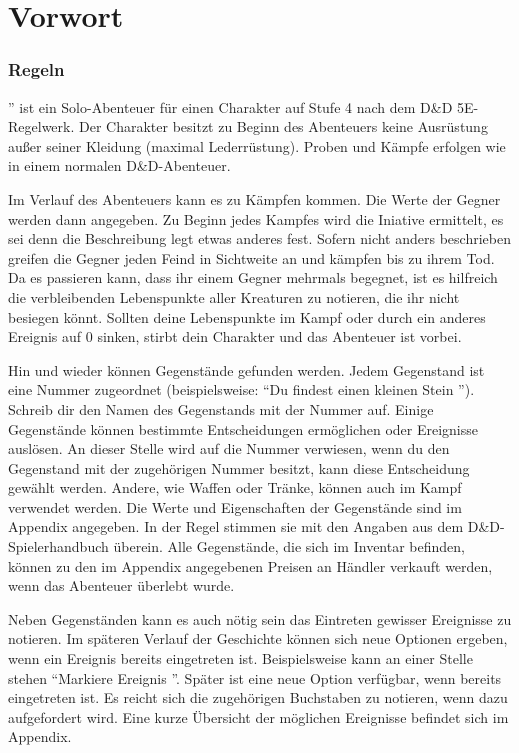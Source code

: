 
\chapter*{Vorwort}

\subsection{Regeln}

'' ist ein Solo-Abenteuer für einen Charakter auf Stufe 4 nach dem D\&D 5E-Regelwerk. Der Charakter besitzt zu Beginn des Abenteuers keine Ausrüstung außer seiner Kleidung (maximal Lederrüstung). Proben und Kämpfe erfolgen wie in einem normalen D\&D-Abenteuer.

Im Verlauf des Abenteuers kann es zu Kämpfen kommen. Die Werte der Gegner werden dann angegeben. Zu Beginn jedes Kampfes wird die Iniative ermittelt, es sei denn die Beschreibung legt etwas anderes fest. Sofern nicht anders beschrieben greifen die Gegner jeden Feind in Sichtweite an und kämpfen bis zu ihrem Tod. Da es passieren kann, dass ihr einem Gegner mehrmals begegnet, ist es hilfreich die verbleibenden Lebenspunkte aller Kreaturen zu notieren, die ihr nicht besiegen könnt. Sollten deine Lebenspunkte im Kampf oder durch ein anderes Ereignis auf 0 sinken, stirbt dein Charakter und das Abenteuer ist vorbei.

Hin und wieder können Gegenstände gefunden werden. Jedem Gegenstand ist eine Nummer zugeordnet (beispielsweise: ``Du findest einen kleinen Stein ''). Schreib dir den Namen des Gegenstands mit der Nummer auf. Einige Gegenstände können bestimmte Entscheidungen ermöglichen oder Ereignisse auslösen. An dieser Stelle wird auf die Nummer verwiesen, wenn du den Gegenstand mit der zugehörigen Nummer besitzt, kann diese Entscheidung gewählt werden. Andere, wie Waffen oder Tränke, können auch im Kampf verwendet werden. Die Werte und Eigenschaften der Gegenstände sind im Appendix angegeben. In der Regel stimmen sie mit den Angaben aus dem D\&D-Spielerhandbuch überein. Alle Gegenstände, die sich im Inventar befinden, können zu den im Appendix angegebenen Preisen an Händler verkauft werden, wenn das Abenteuer überlebt wurde.

Neben Gegenständen kann es auch nötig sein das Eintreten gewisser Ereignisse zu notieren. Im späteren Verlauf der Geschichte können sich neue Optionen ergeben, wenn ein Ereignis bereits eingetreten ist. Beispielsweise kann an einer Stelle stehen ``Markiere Ereignis ''. Später ist eine neue Option verfügbar, wenn  bereits eingetreten ist. Es reicht sich die zugehörigen Buchstaben zu notieren, wenn dazu aufgefordert wird. Eine kurze Übersicht der möglichen Ereignisse befindet sich im Appendix.

